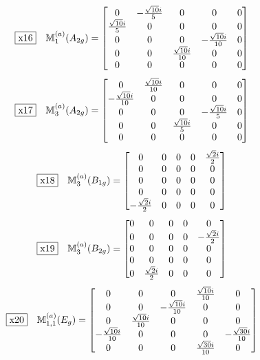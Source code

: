 \documentclass[fleqn,10pt,landscape]{jsarticle}
\begin{document}
\begin{dmath*}
\fbox{x16}\quad \mathbb{M}_{1}^{(a)}(A_{2g})=\begin{bmatrix} 0 & - \frac{\sqrt{10} i}{5} & 0 & 0 & 0 \\ \frac{\sqrt{10} i}{5} & 0 & 0 & 0 & 0 \\ 0 & 0 & 0 & - \frac{\sqrt{10} i}{10} & 0 \\ 0 & 0 & \frac{\sqrt{10} i}{10} & 0 & 0 \\ 0 & 0 & 0 & 0 & 0 \end{bmatrix}
\end{dmath*}
\begin{dmath*}
\fbox{x17}\quad \mathbb{M}_{3}^{(a)}(A_{2g})=\begin{bmatrix} 0 & \frac{\sqrt{10} i}{10} & 0 & 0 & 0 \\ - \frac{\sqrt{10} i}{10} & 0 & 0 & 0 & 0 \\ 0 & 0 & 0 & - \frac{\sqrt{10} i}{5} & 0 \\ 0 & 0 & \frac{\sqrt{10} i}{5} & 0 & 0 \\ 0 & 0 & 0 & 0 & 0 \end{bmatrix}
\end{dmath*}
\begin{dmath*}
\fbox{x18}\quad \mathbb{M}_{3}^{(a)}(B_{1g})=\begin{bmatrix} 0 & 0 & 0 & 0 & \frac{\sqrt{2} i}{2} \\ 0 & 0 & 0 & 0 & 0 \\ 0 & 0 & 0 & 0 & 0 \\ 0 & 0 & 0 & 0 & 0 \\ - \frac{\sqrt{2} i}{2} & 0 & 0 & 0 & 0 \end{bmatrix}
\end{dmath*}
\begin{dmath*}
\fbox{x19}\quad \mathbb{M}_{3}^{(a)}(B_{2g})=\begin{bmatrix} 0 & 0 & 0 & 0 & 0 \\ 0 & 0 & 0 & 0 & - \frac{\sqrt{2} i}{2} \\ 0 & 0 & 0 & 0 & 0 \\ 0 & 0 & 0 & 0 & 0 \\ 0 & \frac{\sqrt{2} i}{2} & 0 & 0 & 0 \end{bmatrix}
\end{dmath*}
\begin{dmath*}
\fbox{x20}\quad \mathbb{M}_{1,1}^{(a)}(E_{g})=\begin{bmatrix} 0 & 0 & 0 & \frac{\sqrt{10} i}{10} & 0 \\ 0 & 0 & - \frac{\sqrt{10} i}{10} & 0 & 0 \\ 0 & \frac{\sqrt{10} i}{10} & 0 & 0 & 0 \\ - \frac{\sqrt{10} i}{10} & 0 & 0 & 0 & - \frac{\sqrt{30} i}{10} \\ 0 & 0 & 0 & \frac{\sqrt{30} i}{10} & 0 \end{bmatrix}
\end{dmath*}
\end{document}

